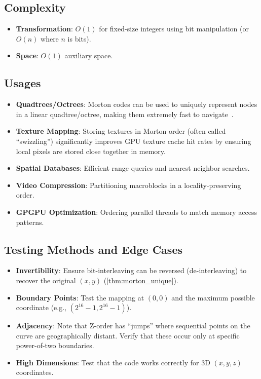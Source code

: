 \subsection{Complexity}
\begin{itemize}
    \item \textbf{Transformation}: $O(1)$ for fixed-size integers using bit manipulation (or $O(n)$ where $n$ is bits).
    \item \textbf{Space}: $O(1)$ auxiliary space.
\end{itemize}

\subsection{Usages}
\begin{itemize}
    \item \textbf{Quadtrees/Octrees}: Morton codes can be used to uniquely represent nodes in a linear quadtree/octree, making them extremely fast to navigate~\cite{samet1984}.
    \item \textbf{Texture Mapping}: Storing textures in Morton order (often called ``swizzling'') significantly improves GPU texture cache hit rates by ensuring local pixels are stored close together in memory.
    \item \textbf{Spatial Databases}: Efficient range queries and nearest neighbor searches.
    \item \textbf{Video Compression}: Partitioning macroblocks in a locality-preserving order.
    \item \textbf{GPGPU Optimization}: Ordering parallel threads to match memory access patterns.
\end{itemize}

\subsection{Testing Methods and Edge Cases}
\begin{itemize}
    \item \textbf{Invertibility}: Ensure bit-interleaving can be reversed (de-interleaving) to recover the original $(x, y)$ (\cref{thm:morton_unique}).
    \item \textbf{Boundary Points}: Test the mapping at $(0,0)$ and the maximum possible coordinate (e.g., $(2^{16}-1, 2^{16}-1)$).
    \item \textbf{Adjacency}: Note that Z-order has ``jumps'' where sequential points on the curve are geographically distant. Verify that these occur only at specific power-of-two boundaries.
    \item \textbf{High Dimensions}: Test that the code works correctly for 3D $(x, y, z)$ coordinates.
\end{itemize}


